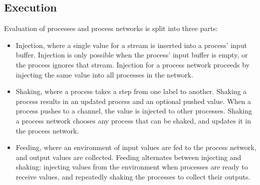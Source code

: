 % 
% 


\subsection{Execution}
\label{s:Process:Eval}




Evaluation of processes and process networks is split into three parts:
\begin{itemize}
\item Injection, where a single value for a stream is inserted into a process' input buffer.
Injection is only possible when the process' input buffer is empty, or the process ignores that stream.
Injection for a process network proceeds by injecting the same value into all processes in the network.

\item Shaking, where a process takes a step from one label to another.
Shaking a process results in an updated process and an optional pushed value.
When a process pushes to a channel, the value is injected to other processes.
Shaking a process network chooses any process that can be shaked, and updates it in the process network.

\item Feeding, where an environment of input values are fed to the process network, and output values are collected.
Feeding alternates between injecting and shaking: injecting values from the environment when processes are ready to receive values, and repeatedly shaking the processes to collect their outputs.
\end{itemize}

